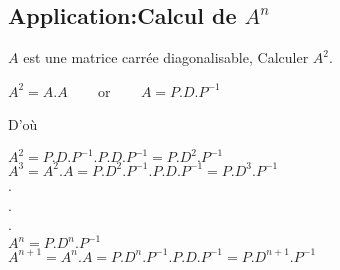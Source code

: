 \documentclass[a4paper,12pt,french]{article}
\begin{document}
 \subsection{Application:Calcul de $A^n$}
 $A$ est une matrice carrée diagonalisable, Calculer $A^2$.
 \begin{center}
 	$A^2=A.A$ ~~~ or ~~~ $A=P.D.P^{-1}$\\
 \end{center}
 	D'où 
 \begin{center}
    $A^{2}=P.D.P^{-1}.P.D.P^{-1}=P.D^2.P^{-1}$\\
    $A^{3}=A^{2}.A=P.D^{2}.P^{-1}.P.D.P^{-1}=P.D^3.P^{-1}$\\
     .\\
     .\\
     .\\
    $A^n=P.D^n.P^{-1}$\\
    $A^{n+1}=A^n.A=P.D^n.P^{-1}.P.D.P^{-1}=P.D^{n+1}.P^{-1}$ 
    
 \end{center}
 
 
\end{document}
